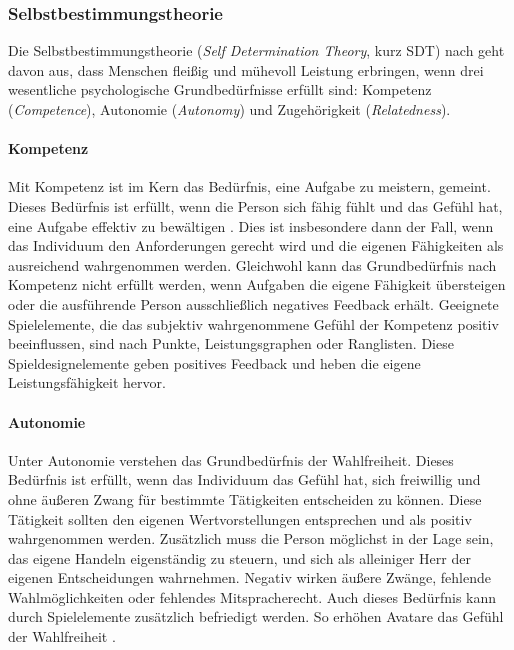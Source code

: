 \subsubsection{Selbstbestimmungstheorie}
Die Selbstbestimmungstheorie (\textit{Self Determination Theory}, kurz SDT) nach  geht davon aus, dass Menschen fleißig und mühevoll Leistung erbringen, wenn drei wesentliche psychologische Grundbedürfnisse erfüllt sind: Kompetenz (\textit{Competence}), Autonomie (\textit{Autonomy}) und Zugehörigkeit (\textit{Relatedness}).

 \paragraph{Kompetenz}
 Mit Kompetenz ist im Kern das Bedürfnis, eine Aufgabe zu meistern, gemeint. Dieses Bedürfnis ist erfüllt, wenn die Person sich fähig fühlt und das Gefühl hat, eine Aufgabe effektiv zu bewältigen \cite{ryan2017self}. Dies ist insbesondere dann der Fall, wenn das Individuum den Anforderungen gerecht wird und die eigenen Fähigkeiten als ausreichend wahrgenommen werden. Gleichwohl kann das Grundbedürfnis nach Kompetenz nicht erfüllt werden, wenn Aufgaben die eigene Fähigkeit übersteigen oder die ausführende Person ausschließlich negatives Feedback erhält. Geeignete Spielelemente, die das subjektiv wahrgenommene Gefühl der Kompetenz positiv beeinflussen, sind nach  Punkte, Leistungsgraphen oder Ranglisten. Diese Spieldesignelemente geben positives Feedback und heben die eigene Leistungsfähigkeit hervor.
 
 
 \paragraph{Autonomie}
 Unter Autonomie verstehen  das Grundbedürfnis der Wahlfreiheit. Dieses Bedürfnis ist erfüllt, wenn das Individuum das Gefühl hat, sich freiwillig und ohne äußeren Zwang für bestimmte Tätigkeiten entscheiden zu können. Diese Tätigkeit sollten den eigenen Wertvorstellungen entsprechen und als positiv wahrgenommen werden. Zusätzlich muss die Person möglichst in der Lage sein, das eigene Handeln eigenständig zu steuern, und sich als alleiniger Herr der eigenen Entscheidungen wahrnehmen. Negativ wirken äußere Zwänge, fehlende Wahlmöglichkeiten oder fehlendes Mitspracherecht. Auch dieses Bedürfnis kann durch Spielelemente zusätzlich befriedigt werden. So erhöhen Avatare das Gefühl der Wahlfreiheit \cite{sailer2016wirkung}.
  
